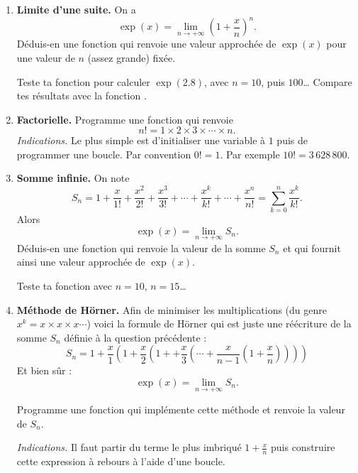 \documentclass[11pt,class=report,crop=false]{standalone}
\begin{document}
\begin{activite}


\begin{enumerate}
  \item \textbf{Limite d'une suite.}
  On a  
  $$\exp(x) = \lim_{n\to+\infty} \left(1+\frac xn\right)^n.$$
   Déduis-en une fonction  qui renvoie une valeur approchée de $\exp(x)$ pour une valeur de $n$ (assez grande) fixée.
   
   Teste ta fonction pour calculer $\exp(2.8)$, avec $n=10$, puis $100$\ldots{} Compare tes résultats avec la fonction \Python{} .
   
   \item \textbf{Factorielle.} Programme une fonction  qui renvoie 
   $$n! = 1\times 2 \times 3 \times \cdots \times n.$$
   \emph{Indications.} Le plus simple est d'initialiser une variable  à $1$ puis de programmer une boucle. Par convention $0! = 1$.  
   Par exemple $10! = 3\,628\,800$.
   
   \item \textbf{Somme infinie.}
   On note 
   $$S_n = 1 + \frac{x}{1!} + \frac{x^2}{2!}+ \frac{x^3}{3!} + \cdots + \frac{x^k}{k!}+\cdots + \frac{x^n}{n!} =  \sum_{k=0}^n \frac{x^k}{k!}.$$
   Alors 
   $$\exp(x) = \lim_{n\to+\infty} S_n.$$
   Déduis-en une fonction  qui renvoie la valeur de la somme $S_n$   et qui fournit ainsi  une valeur approchée de $\exp(x)$.
   
  Teste ta fonction avec $n=10$, $n=15$\ldots   
   
   \item \textbf{Méthode de Hörner.} Afin de minimiser les multiplications (du genre $x^k = x \times x \times x \cdots$) voici la formule de Hörner qui est juste une réécriture de la somme $S_n$  définie à la question précédente :
   $$S_n = 1 + \frac{x}{1} \left(1 + \frac{x}{2} \left(1 + + \frac{x}{3} \left(\cdots  + \frac{x}{n-1}\left(1+\frac{x}{n}\right) \right) \right)\right)$$
  Et bien sûr :
  $$\exp(x) = \lim_{n\to+\infty} S_n.$$
  

  Programme une fonction  qui implémente cette méthode et renvoie la valeur de $S_n$. 
  
  \emph{Indications.} Il faut partir du terme le plus imbriqué $1+\frac{x}{n}$ puis construire cette expression à rebours à l'aide d'une boucle.
  

\end{enumerate}
\end{activite}
\end{document}
